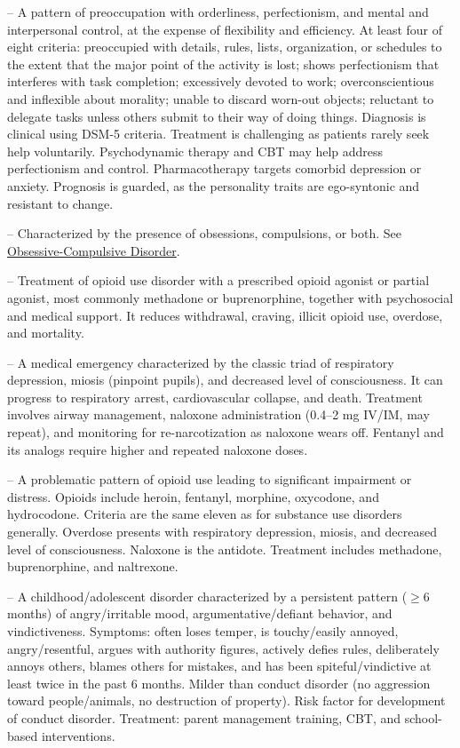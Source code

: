 -- A pattern of preoccupation with orderliness, perfectionism, and mental and interpersonal control, at the expense of flexibility and efficiency. At least four of eight criteria: preoccupied with details, rules, lists, organization, or schedules to the extent that the major point of the activity is lost; shows perfectionism that interferes with task completion; excessively devoted to work; overconscientious and inflexible about morality; unable to discard worn-out objects; reluctant to delegate tasks unless others submit to their way of doing things. Diagnosis is clinical using DSM-5 criteria. Treatment is challenging as patients rarely seek help voluntarily. Psychodynamic therapy and CBT may help address perfectionism and control. Pharmacotherapy targets comorbid depression or anxiety. Prognosis is guarded, as the personality traits are ego-syntonic and resistant to change.

-- Characterized by the presence of obsessions, compulsions, or both. See \hyperlink{Obsessive-Compulsive Disorder}{Obsessive-Compulsive Disorder}.

-- Treatment of opioid use disorder with a prescribed opioid agonist or partial agonist, most commonly methadone or buprenorphine, together with psychosocial and medical support. It reduces withdrawal, craving, illicit opioid use, overdose, and mortality.

-- A medical emergency characterized by the classic triad of respiratory depression, miosis (pinpoint pupils), and decreased level of consciousness. It can progress to respiratory arrest, cardiovascular collapse, and death. Treatment involves airway management, naloxone administration (0.4--2 mg IV/IM, may repeat), and monitoring for re-narcotization as naloxone wears off. Fentanyl and its analogs require higher and repeated naloxone doses.

-- A problematic pattern of opioid use leading to significant impairment or distress. Opioids include heroin, fentanyl, morphine, oxycodone, and hydrocodone. Criteria are the same eleven as for substance use disorders generally. Overdose presents with respiratory depression, miosis, and decreased level of consciousness. Naloxone is the antidote. Treatment includes methadone, buprenorphine, and naltrexone.

-- A childhood/adolescent disorder characterized by a persistent pattern (\(\ge\)6 months) of angry/irritable mood, argumentative/defiant behavior, and vindictiveness. Symptoms: often loses temper, is touchy/easily annoyed, angry/resentful, argues with authority figures, actively defies rules, deliberately annoys others, blames others for mistakes, and has been spiteful/vindictive at least twice in the past 6 months. Milder than conduct disorder (no aggression toward people/animals, no destruction of property). Risk factor for development of conduct disorder. Treatment: parent management training, CBT, and school-based interventions.

